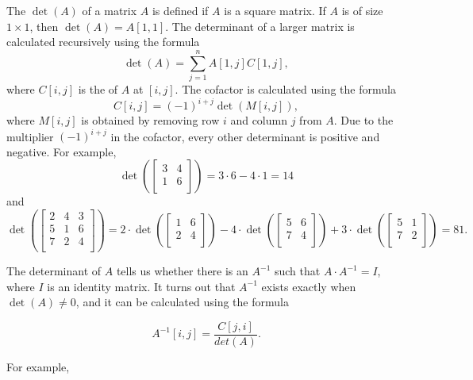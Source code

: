 
The  $\det(A)$ of a matrix $A$
is defined if $A$ is a square matrix.
If $A$ is of size $1 \times 1$,
then $\det(A)=A[1,1]$.
The determinant of a larger matrix is
calculated recursively using the formula 
\[\det(A)=\sum_{j=1}^n A[1,j] C[1,j],\]
where $C[i,j]$ is the  of $A$
at $[i,j]$.
The cofactor is calculated using the formula
\[C[i,j] = (-1)^{i+j} \det(M[i,j]),\]
where $M[i,j]$ is obtained by removing
row $i$ and column $j$ from $A$.
Due to the multiplier $(-1)^{i+j}$ in the cofactor,
every other determinant is positive
and negative.
For example,
\[
\det(
 \begin{bmatrix}
  3 & 4 \\
  1 & 6 \\
 \end{bmatrix}
) = 3 \cdot 6 - 4 \cdot 1 = 14 
\]
and
\[
\det(
 \begin{bmatrix}
  2 & 4 & 3 \\
  5 & 1 & 6 \\
  7 & 2 & 4 \\
 \end{bmatrix}
) = 
2 \cdot
\det(
 \begin{bmatrix}
  1 & 6 \\
  2 & 4 \\
 \end{bmatrix}
)
-4 \cdot
\det(
 \begin{bmatrix}
  5 & 6 \\
  7 & 4 \\
 \end{bmatrix}
)
+3 \cdot
\det(
 \begin{bmatrix}
  5 & 1 \\
  7 & 2 \\
 \end{bmatrix}
) = 81.
\]


The determinant of $A$ tells us
whether there is an 
$A^{-1}$ such that $A \cdot A^{-1} = I$,
where $I$ is an identity matrix.
It turns out that $A^{-1}$ exists
exactly when $\det(A) \neq 0$,
and it can be calculated using the formula

\[A^{-1}[i,j] = \frac{C[j,i]}{det(A)}.\]

For example,

